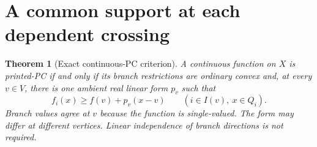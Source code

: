 \documentclass[11pt]{article}
\newtheorem{theorem}{Theorem}
\begin{document}
\section{A common support at each dependent crossing}
\begin{theorem}[Exact continuous-PC criterion]\label{criterion}
A continuous function on $X$ is printed-PC if and only if its branch restrictions are ordinary convex and, at every $v\in V$, there is one ambient real linear form $p_v$ such that
\begin{equation}\label{support}
 f_i(x)\geq f(v)+p_v(x-v)\qquad(i\in I(v),\ x\in Q_i).
\end{equation}
Branch values agree at $v$ because the function is single-valued. The form may differ at different vertices. Linear independence of branch directions is not required.
\end{theorem}
\end{document}
